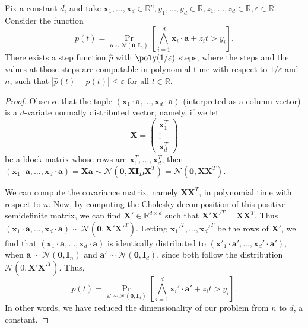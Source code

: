 \documentclass[a4paper,11pt, DIV=11]{scrartcl}
\newcommand{\vx}{\ensuremath{\mathbf{x}}}
\newcommand{\va}{\ensuremath{\mathbf{a}}}
\renewcommand{\epsilon}{\varepsilon}
\renewcommand{\R}{\ensuremath{\mathbb{R}}}
\theoremstyle{plain}
\theoremstyle{definition}
\begin{document}
\begin{theorem}\label{thm:stepApprox}
    Fix a constant $d$, and take $\vx_{1}, \ldots, \vx_d \in \mathbb{R}^n, y_1, \ldots, y_d \in \mathbb{R}, z_1, \ldots, z_d \in \mathbb{R}, \epsilon \in \mathbb{R}$. Consider the function
    \[
    p(t) = \Pr_{\va \sim \mathcal{N}(\mathbf{0}, \mathbf{I}_n)}\left[\bigwedge_{i=1}^d \vx_{i} \cdot \va + z_i t > y_i \right].
    \]
    There exists a step function $\widehat{p}$ with $\poly(1/\epsilon)$ steps, where the steps and the values at those steps are computable in polynomial time with respect to $1 / \epsilon$
    and $n$, such that $| \widehat{p}(t) - p(t)| \leq \epsilon$ for all $t \in \mathbb{R}$.
\end{theorem}
\begin{proof}
    Observe that the tuple $(\vx_1 \cdot \va, \ldots, \vx_d \cdot \va)$ (interpreted as a column vector) is a $d$-variate normally distributed vector; namely, if we let
    \[
    \mathbf{X} =
    \begin{pmatrix}
        \vx_1^T \\ 
        \vdots \\
        \vx_d^T
    \end{pmatrix}
    \]
    be a block matrix whose rows are $\vx_1^T, \ldots, \vx_d^T$, then $(\vx_1 \cdot \va, \ldots, \vx_d \cdot \va) = \mathbf{X} \va \sim \mathcal{N}(\mathbf{0}, \mathbf{X} \mathbf{I}_D \mathbf{X}^T) = \mathcal{N}(\mathbf{0}, \mathbf{X} \mathbf{X}^T)$.
    
    We can compute the covariance matrix, namely $\mathbf{X} \mathbf{X}^T$, in polynomial time with respect to $n$. Now, by computing the Cholesky decomposition of this positive semidefinite matrix, we can find $\mathbf{X}' \in \R^{d \times d}$ such that $\mathbf{X}' \mathbf{X}'^T = \mathbf{X}\mathbf{X}^T$. Thus $(\vx_1 \cdot \va, \ldots, \vx_d \cdot \va) \sim \mathcal{N}(\mathbf{0}, \mathbf{X}' \mathbf{X}'^T)$.
Letting $\vx_1'^T, \ldots, \vx_d'^T$ be the rows of $\mathbf{X}'$, we find that $(\vx_1 \cdot \va, \ldots, \vx_d \cdot \va)$ is identically distributed to $(\vx'_1 \cdot \va', \ldots, \vx_d' \cdot \va')$, when $\va \sim \mathcal{N}(\mathbf{0}, \mathbf{I}_n)$ and $\va' \sim \mathcal{N}(\mathbf{0}, \mathbf{I}_d)$, since both follow the distribution $\mathcal{N}(0, \mathbf{X}' \mathbf{X}'^T)$. Thus,
    \[
    p(t) = \Pr_{\va' \sim \mathcal{N}(\mathbf{0}, \mathbf{I}_d)}\left[\bigwedge_{i=1}^d \vx_{i}' \cdot \va' + z_i t > y_i \right].
    \]
    In other words, we have reduced the dimensionality of our problem from $n$ to $d$, a constant.


\end{proof}
\end{document}
